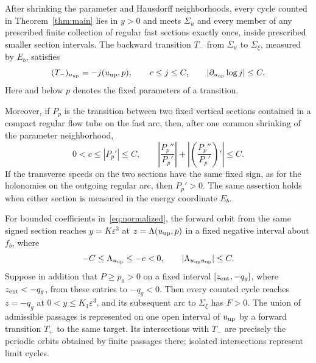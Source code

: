 \begin{lemma}\label{lem:sections}
After shrinking the parameter and Hausdorff neighborhoods, every
cycle counted in Theorem~\ref{thm:main} lies in $y>0$ and meets
$\Sigma_u$ and every member of any prescribed finite collection of
regular fast sections exactly once, inside prescribed smaller section
intervals. The backward transition $T_-$ from $\Sigma_u$ to
$\Sigma_\xi$, measured by $E_b$, satisfies
\begin{equation}\label{eq:short-map}
 (T_-)_{u_{\rm up}}=-j(u_{\rm up},p),\qquad c\le j\le C,
 \qquad |\partial_{u_{\rm up}}\log j|\le C.
\end{equation}
Here and below $p$ denotes the fixed parameters of a transition.

Moreover, if $P_p$ is the transition between two fixed vertical sections
contained in a compact regular flow tube on the fast arc, then, after one
common shrinking of the parameter neighborhood,
\begin{equation}\label{eq:regular-holonomy-jets}
 0<c\le |P_p'|\le C,\qquad
 \left|\frac{P_p''}{P_p'}\right|
 +\left|\left(\frac{P_p''}{P_p'}\right)'\right|\le C .
\end{equation}
If the transverse speeds on the two sections have the same fixed sign,
as for the holonomies on the outgoing regular arc, then $P_p'>0$.
The same assertion holds when either section is measured in the energy
coordinate $E_b$.

For bounded coefficients in~\eqref{eq:normalized}, the forward orbit
from the same signed section reaches $y=K\varepsilon^3$ at
$z=\Lambda(u_{\rm up},p)$ in a fixed negative interval about $f_b$, where
\begin{equation}\label{eq:relaxation-map}
 -C\le\Lambda_{u_{\rm up}}\le-c<0,\qquad
 |\Lambda_{u_{\rm up}u_{\rm up}}|\le C.
\end{equation}
Suppose in addition that $P\ge p_0>0$ on a fixed interval
$[z_{\rm ent},-q_g]$, where $z_{\rm ent}<-q_g$, from these entries to
$-q_g<0$. Then every counted cycle reaches
$z=-q_g$ at $0<y\le K_1\varepsilon^3$, and its subsequent arc
to $\Sigma_\xi$ has $F>0$. The union of admissible passages is
represented on one open interval of $u_{\rm up}$ by a forward transition $T_+$
to the same target. Its intersections with $T_-$ are precisely the
periodic orbits obtained by finite passages there; isolated intersections
represent limit cycles.
\end{lemma}
